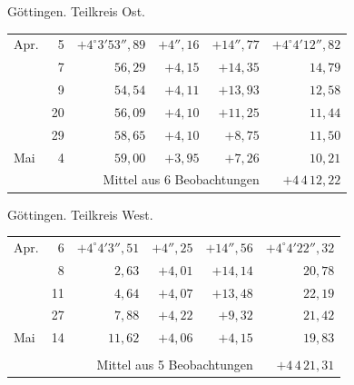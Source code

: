 \noindent\begin{minipage}[t]{.495\textwidth}\centering Göttingen. Teilkreis Ost.\par\smallskip
{\scriptsize\setlength{\tabcolsep}{1pt}\renewcommand{\arraystretch}{1.2}\begin{tabular}{lr|r|r|r|r|}
Apr.&5&$+4^\circ3'53''{,}89$&$+4''{,}16$&$+14''{,}77$&$+4^\circ4'12''{,}82$\\
&7&$56{,}29$&$+4{,}15$&$+14{,}35$&$14{,}79$\\
&9&$54{,}54$&$+4{,}11$&$+13{,}93$&$12{,}58$\\
&20&$56{,}09$&$+4{,}10$&$+11{,}25$&$11{,}44$\\
&29&$58{,}65$&$+4{,}10$&$+8{,}75$&$11{,}50$\\
Mai&4&$59{,}00$&$+3{,}95$&$+7{,}26$&$10{,}21$\\
\cline{6-6}\multicolumn{5}{r}{Mittel aus 6 Beobachtungen}&$+4\,4\,12{,}22$
\end{tabular}}\end{minipage}\hfill\begin{minipage}[t]{.495\textwidth}\centering Göttingen. Teilkreis West.\par\smallskip
{\scriptsize\setlength{\tabcolsep}{1pt}\renewcommand{\arraystretch}{1.2}\begin{tabular}{lr|r|r|r|r}
Apr.&6&$+4^\circ4'3''{,}51$&$+4''{,}25$&$+14''{,}56$&$+4^\circ4'22''{,}32$\\
&8&$2{,}63$&$+4{,}01$&$+14{,}14$&$20{,}78$\\
&11&$4{,}64$&$+4{,}07$&$+13{,}48$&$22{,}19$\\
&27&$7{,}88$&$+4{,}22$&$+9{,}32$&$21{,}42$\\
Mai&14&$11{,}62$&$+4{,}06$&$+4{,}15$&$19{,}83$\\
&&&&&\\
\cline{6-6}\multicolumn{5}{r}{Mittel aus 5 Beobachtungen}&$+4\,4\,21{,}31$
\end{tabular}}\end{minipage}
\par\vspace{4mm}

